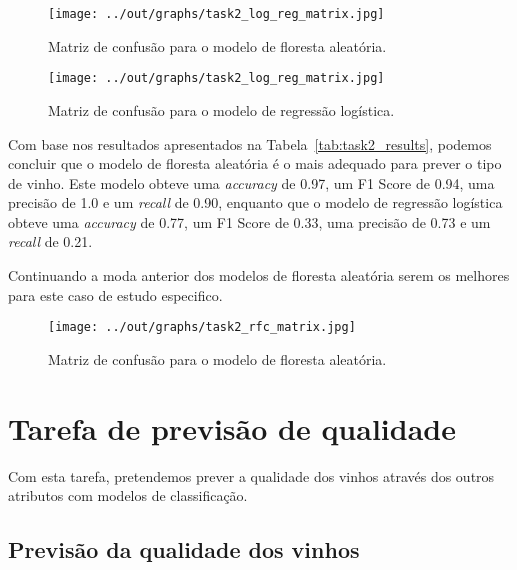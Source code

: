 \documentclass{article}
\begin{document}
\begin{figure}[ht]
  \centering
  \begin{minipage}{0.45\textwidth}
    \centering
    \texttt{[image: ../out/graphs/task2\_log\_reg\_matrix.jpg]}
    \caption{Matriz de confusão para o modelo de floresta aleatória.}
    \label{fig:task2_random_forest_matrix}
  \end{minipage}
  \hfill
  \begin{minipage}{0.45\textwidth}
    \centering
    \texttt{[image: ../out/graphs/task2\_log\_reg\_matrix.jpg]}
    \caption{Matriz de confusão para o modelo de regressão logística.}
    \label{fig:task2_log_reg_matrix}
  \end{minipage}
\end{figure}

Com base nos resultados apresentados na Tabela~\ref{tab:task2_results}, podemos concluir que o modelo de floresta aleatória é o mais adequado para prever o tipo de vinho. Este modelo obteve uma \textit{accuracy} de 0.97, um F1 Score de 0.94, uma precisão de 1.0 e um \textit{recall} de 0.90, enquanto que o modelo de regressão logística obteve uma \textit{accuracy} de 0.77, um F1 Score de 0.33, uma precisão de 0.73 e um \textit{recall} de 0.21.

Continuando a moda anterior dos modelos de floresta aleatória serem os melhores para este caso de estudo especifico.

\begin{figure}
  \centering
  \begin{minipage}{0.90\textwidth}
    \centering
    \texttt{[image: ../out/graphs/task2\_rfc\_matrix.jpg]}
    \caption{Matriz de confusão para o modelo de floresta aleatória.}
    \label{fig:task2_random_forest_matrix}
  \end{minipage}
\end{figure}

\section{Tarefa de previsão de qualidade}

Com esta tarefa, pretendemos prever a qualidade dos vinhos através dos outros atributos com modelos de classificação.

\subsection{Previsão da qualidade dos vinhos}
\end{document}
